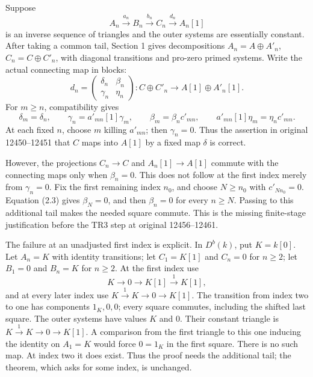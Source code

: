 Suppose \[
A_n\xrightarrow{a_n}B_n\xrightarrow{b_n}C_n
 \xrightarrow{d_n}A_n[1] \tag{2.1}
\] is an inverse sequence of triangles and the outer systems are essentially constant. After taking a common tail,\allowbreak{} Section 1 gives decompositions \(A_n=A\oplus A'_n\),\allowbreak{} \(C_n=C\oplus C'_n\),\allowbreak{} with diagonal transitions and pro-zero primed systems. Write the actual connecting map in blocks:\allowbreak{} \[
d_n=
\begin{pmatrix}
\delta_n&\beta_n\\
\gamma_n&\eta_n
\end{pmatrix}
:C\oplus C'_n\longrightarrow A[1]\oplus A'_n[1]. \tag{2.2}
\] For \(m\geq n\),\allowbreak{} compatibility gives \[
\delta_m=\delta_n,\qquad
\gamma_n=a'_{mn}[1]\gamma_m,\qquad
\beta_m=\beta_n c'_{mn},\qquad
a'_{mn}[1]\eta_m=\eta_n c'_{mn}. \tag{2.3}
\] At each fixed \(n\),\allowbreak{} choose \(m\) killing \(a'_{mn}\); then \(\gamma_n=0\). Thus the assertion in original 12450–\allowbreak{}12451 that \(C\) maps into \(A[1]\) by a fixed map \(\delta\) is correct.

However,\allowbreak{} the projections \(C_n\to C\) and \(A_n[1]\to A[1]\) commute with the connecting maps only when \(\beta_n=0\). This does not follow at the first index merely from \(\gamma_n=0\). Fix the first remaining index \(n_0\),\allowbreak{} and choose \(N\geq n_0\) with \(c'_{N n_0}=0\). Equation (2.3)\allowbreak{} gives \(\beta_N=0\),\allowbreak{} and then \(\beta_n=0\) for every \(n\geq N\). Passing to this additional tail makes the needed square commute. This is the missing finite-stage justification before the TR3 step at original 12456–\allowbreak{}12461.

The failure at an unadjusted first index is explicit. In \(D^b(k)\),\allowbreak{} put \(K=k[0]\). Let \(A_n=K\) with identity transitions; let \(C_1=K[1]\) and \(C_n=0\) for \(n\geq2\); let \(B_1=0\) and \(B_n=K\) for \(n\geq2\). At the first index use \[
K\longrightarrow0\longrightarrow K[1]\xrightarrow{1}K[1],
\] and at every later index use \(K\xrightarrow{1}K\to0\to K[1]\). The transition from index two to one has components \(1_K,0,0\); every square commutes,\allowbreak{} including the shifted last square. The outer systems have values \(K\) and \(0\). Their constant triangle is \(K\xrightarrow{1}K\to0\to K[1]\). A comparison from the first triangle to this one inducing the identity on \(A_1=K\) would force \(0=1_K\) in the first square. There is no such map. At index two it does exist. Thus the proof needs the additional tail; the theorem,\allowbreak{} which asks for some index,\allowbreak{} is unchanged.

